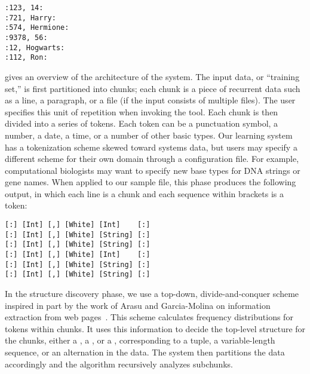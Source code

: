 \documentclass[preprint]{sig-alternate-sigmod08}
\newcommand{\shrink}{\vspace*{-5mm}}
\begin{document}
{\small 
\begin{verbatim}
:123, 14:
:721, Harry:
:574, Hermione:
:9378, 56:
:12, Hogwarts:
:112, Ron:
\end{verbatim}
}

 gives an overview of the architecture of the system.
The input data, or ``training set,'' is first partitioned into chunks;
each chunk is a piece of recurrent data such as a line, 
a paragraph, or a file (if the input consists of multiple files).
The user specifies this unit of repetition when invoking the tool.
Each chunk is then divided into a series of tokens.  Each
token can be a punctuation symbol, a number, a date, a time, or a number of other
basic types.  Our learning system has a tokenization scheme
skewed toward systems data, but users may specify a different scheme 
for their own domain through a configuration file.  For example,
computational biologists may want to specify new base types for DNA strings
or gene names.  When applied to our sample file,
this phase produces the following output, in which each line is a chunk
and each sequence within brackets is a token:

{\small
\begin{verbatim}
[:] [Int] [,] [White] [Int]    [:]
[:] [Int] [,] [White] [String] [:]
[:] [Int] [,] [White] [String] [:]
[:] [Int] [,] [White] [Int]    [:]
[:] [Int] [,] [White] [String] [:]
[:] [Int] [,] [White] [String] [:]
\end{verbatim}
}

\begin {figure*}[tbh]
\begin{center}
\begin{minipage}[t]{0.5\columnwidth}
\end{minipage}
\hfill
\begin{minipage}[t]{0.5\columnwidth}
\end{minipage}
\hfill
\begin{minipage}[t]{0.5\columnwidth}
\end{minipage}
\caption{Histograms calculuated from sample data file (from left to right): 
(a) first iteration, (b) second iteration (context 1) 
and (c) second iteration (context 2)} \label{fig-hist}
\shrink
\end{center}
\end{figure*}

In the structure discovery phase, we use a top-down, divide-and-conquer
scheme inspired in part by the work of Arasu and Garcia-Molina on
information extraction from web pages~\cite{arasu+:sigmod03}. 
This scheme calculates frequency distributions for tokens within
chunks.  It uses this information to
decide the top-level structure for the chunks, either a 
, a , or a , corresponding to a
tuple, a variable-length sequence, or an alternation in the data.
The system then partitions the data accordingly
and the algorithm recursively analyzes subchunks. 
\end{document}
